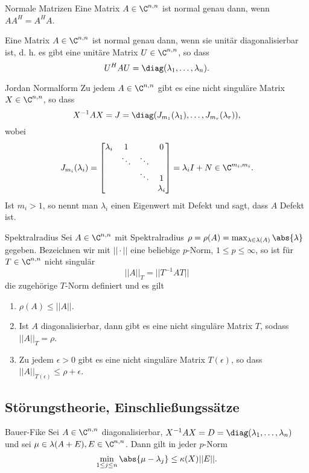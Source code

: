 \begin{karte}{Normale Matrizen}
    Eine Matrix \(A\in \C^{n,n}\) ist normal genau dann, wenn \(A A^H = A^H A\). 

    Eine Matrix \(A\in \C^{n,n}\) ist normal genau dann, wenn sie unitär diagonalisierbar ist, 
    d. h. es gibt eine unitäre Matrix \(U\in \C^{n,n}\), so dass 
    \[ U^H A U = \diag(\lambda_1, \ldots, \lambda_n). \]
\end{karte}

\begin{karte}{Jordan Normalform}
    Zu jedem \( A \in \C^{n,n} \) gibt es eine nicht singuläre Matrix 
    \(X\in \C^{n,n}\), so dass
    \[ X^{-1} A X = J = \diag(J_{m_1}(\lambda_1), \ldots, J_{m_r}(\lambda_r)), \]
    wobei 
    \[ J_{m_i}(\lambda_i) = \left[ \begin{matrix}
        \lambda_i & 1 & & 0 \\
        & \ddots & \ddots & \\
        & & \ddots & 1 \\
        & & & \lambda_i
    \end{matrix} \right] = \lambda_i I + N \in \C^{m_i,m_i}. \]
    Ist \(m_i > 1\), so nennt man \(\lambda_i\) einen Eigenwert 
    mit Defekt und sagt, dass \(A\) Defekt ist.
\end{karte}

\begin{karte}{Spektralradius}
    Sei \(A\in \C^{n,n}\) mit Spektralradius \(\rho = \rho(A) = \max_{\lambda\in\lambda(A)} \abs{\lambda}\) gegeben.
    Bezeichnen wir mit \( ||\cdot || \) eine beliebige \(p\)-Norm, \(1\leq p \leq \infty\), 
    so ist für \(T\in \C^{n,n}\) nicht singulär 
    \[ ||A||_T = ||T^{-1} A T|| \] 
    die zugehörige \(T\)-Norm definiert und es gilt 
    \begin{enumerate}
        \item \(\rho(A)\leq ||A||\).
        \item Ist \(A\) diagonalisierbar, dann gibt es eine nicht singuläre Matrix 
        \(T\), sodass \( ||A||_T = \rho \).
        \item Zu jedem \(\epsilon > 0 \) gibt es eine nicht singuläre Matrix 
        \(T(\epsilon)\), so dass \(||A||_{T(\epsilon)} \leq \rho + \epsilon\).
    \end{enumerate}
\end{karte}

\subsection{Störungstheorie, Einschließungssätze}
\begin{karte}{Bauer-Fike}
    Sei \(A\in \C^{n,n}\) diagonalisierbar, \( X^{-1} A X = D = \diag(\lambda_1, \ldots, \lambda_n) \)
    und sei \( \mu \in \lambda(A+E), E \in \C^{n,n} \). Dann gilt in jeder \(p\)-Norm 
    \[ \min_{1\leq j\leq n} \abs{\mu - \lambda_j} \leq \kappa(X) ||E||. \]
\end{karte}

